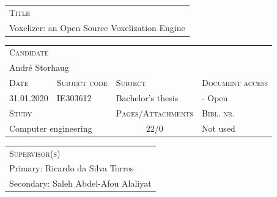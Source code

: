 \noindent
\begin{tabularx}{\textwidth}{ |X| }
	\hline
	\scshape{Title}\\
	Voxelizer: an Open Source Voxelization Engine\\
  	\hline 
\end{tabularx}
\vspace{1em}

\noindent
\begin{tabularx}{\textwidth}{ |l|l|X|X| }
	\hline
	\multicolumn{4}{|l|}{\scshape{Candidate}}\\
	\multicolumn{4}{|l|}{André Storhaug}\\
  	\hline
  	\scshape{Date} & \scshape{Subject code} & \scshape{Subject} & \scshape{Document access} \\
  	31.01.2020 & IE303612 & Bachelor's thesis & - Open \\
  	\hline
	\multicolumn{2}{|l|}{\scshape{Study}} & \scshape{Pages/Attachments} & \scshape{Bibl. nr.}\\
	\multicolumn{2}{|l|}{Computer engineering} & \multicolumn{1}{c|}{22/0} & Not used \\
  	\hline 
\end{tabularx}
\vspace{1em}

\noindent
\begin{tabularx}{\textwidth}{ |X| }
	\hline
	\scshape{Supervisor(s)}\\
	Primary: Ricardo da Silva Torres\\
	Secondary: Saleh Abdel-Afou Alaliyat\\
  	\hline 
\end{tabularx}

\noindent


\restoregeometry
